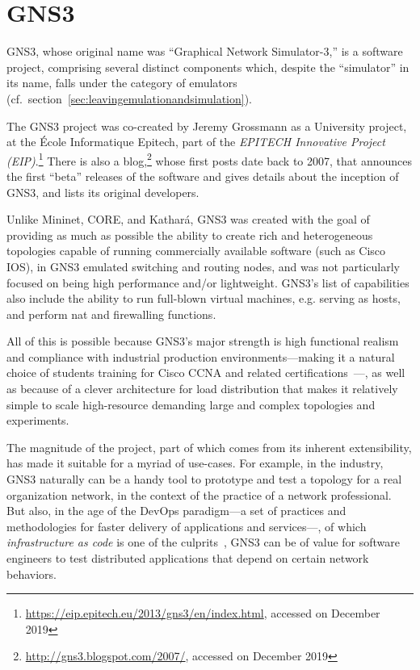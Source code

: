 \section{GNS3}
\label{sec:exemulgns3}

GNS3, whose original name was ``Graphical Network Simulator-3,'' is a software project, comprising several distinct components which, despite the ``simulator'' in its name, falls under the category of emulators (cf.~section~\ref{sec:leavingemulationandsimulation}).

The GNS3 project was co-created by Jeremy Grossmann as a University project, at the École Informatique Epitech, part of the \emph{EPITECH Innovative Project (EIP)}.\footnote{\url{https://eip.epitech.eu/2013/gns3/en/index.html}, accessed on December 2019}
There is also a blog,\footnote{\url{http://gns3.blogspot.com/2007/}, accessed on December 2019} whose first posts date back to 2007, that announces the first ``beta'' releases of the software and gives details about the inception of GNS3, and lists its original developers.

Unlike Mininet, CORE, and Kathará, GNS3 was created with the goal of providing as much as possible the ability to create rich and heterogeneous topologies capable of running commercially available software (such as Cisco IOS), in GNS3 emulated switching and routing nodes, and was not particularly focused on being high performance and/or lightweight.
GNS3's list of capabilities also include the ability to run full-blown virtual machines, e.g. serving as hosts, and perform \gls{nat} and firewalling functions.

All of this is possible because GNS3's major strength is high functional realism and compliance with industrial production environments---making it a natural choice of students training for Cisco CCNA and related certifications~\cite{thebookofgns3,gns3netsimguide}---, as well as because of a clever architecture for load distribution that makes it relatively simple to scale high-resource demanding large and complex topologies and experiments.

The magnitude of the project, part of which comes from its inherent extensibility, has made it suitable for a myriad of use-cases.
For example, in the industry, GNS3 naturally can be a handy tool to prototype and test a topology for a real organization network, in the context of the practice of a network professional.
But also, in the age of the DevOps paradigm---a set of practices and methodologies for faster delivery of applications and services---, of which \emph{infrastructure as code} is one of the culprits~\cite{awswhatisdevops}, GNS3 can be of value for software engineers to test distributed applications that depend on certain network behaviors.

